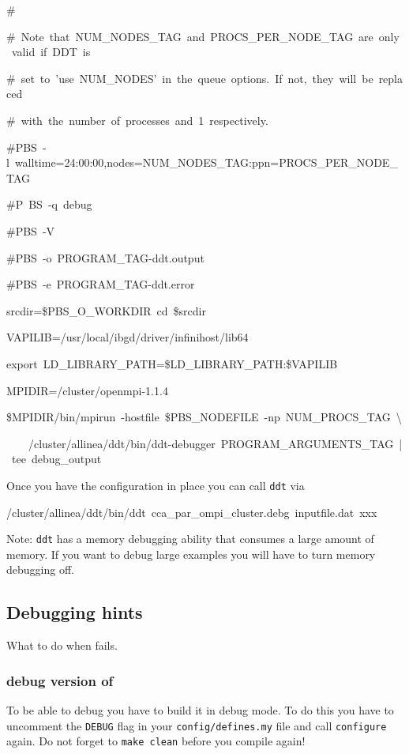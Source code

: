 \begin{itemize}
\begin{lyxcode}
\#~

\#~Note~that~NUM\_NODES\_TAG~and~PROCS\_PER\_NODE\_TAG~are~only~valid~if~DDT~is~

\#~set~to~'use~NUM\_NODES'~in~the~queue~options.~If~not,~they~will~be~replaced~

\#~with~the~number~of~processes~and~1~respectively.

\#PBS~-l~walltime=24:00:00,nodes=NUM\_NODES\_TAG:ppn=PROCS\_PER\_NODE\_TAG~

\#P~BS~-q~debug~

\#PBS~-V~

\#PBS~-o~PROGRAM\_TAG-ddt.output~

\#PBS~-e~PROGRAM\_TAG-ddt.error



srcdir=\$PBS\_O\_WORKDIR~cd~\$srcdir

VAPILIB=/usr/local/ibgd/driver/infinihost/lib64

export~LD\_LIBRARY\_PATH=\$LD\_LIBRARY\_PATH:\$VAPILIB

MPIDIR=/cluster/openmpi-1.1.4

\$MPIDIR/bin/mpirun~-hostfile~\$PBS\_NODEFILE~-np~NUM\_PROCS\_TAG~\textbackslash

~~~~/cluster/allinea/ddt/bin/ddt-debugger~PROGRAM\_ARGUMENTS\_TAG~|~tee~debug\_output
\end{lyxcode}
\end{itemize}
Once you have the configuration in place you can call \texttt{ddt}
via

\begin{lyxcode}
/cluster/allinea/ddt/bin/ddt~cca\_par\_ompi\_cluster.debg~inputfile.dat~xxx
\end{lyxcode}
Note: \texttt{ddt} has a memory debugging ability that consumes a
large amount of memory. If you want to debug large examples you will
have to turn memory debugging off.


\subsection{Debugging hints}

What to do when \ccarat{} fails.


\subsubsection{debug version of \ccarat{}}

To be able to debug \ccarat{} you have to build it in debug mode.
To do this you have to uncomment the \texttt{DEBUG} flag in your \texttt{config/defines.my}
file and call \texttt{configure} again. Do not forget to \texttt{make
clean} before you compile again!

